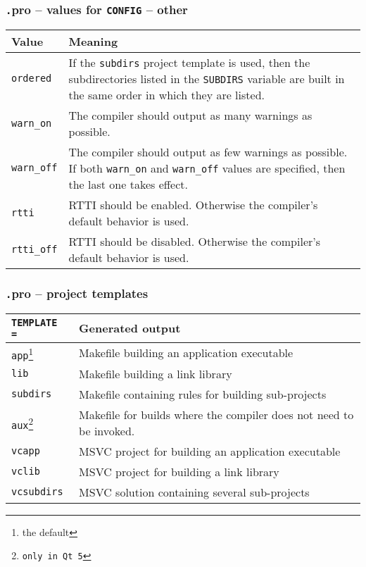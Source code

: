 \begin{frame}
\frametitle{{\texttt .pro} -- values for \texttt{CONFIG} -- other}
  \begin{center}
  \begin{tabular}{|p{}|p{}|}
    \hline
    \textbf{Value} & \textbf{Meaning} \\
    \hline
    \texttt{ordered} & If the \texttt{subdirs} project template is used,
    then the subdirectories listed in the \texttt{SUBDIRS} variable are
    built in the same order in which they are listed. \\
    \hline
    \texttt{warn\_on} & The compiler should output as many warnings as possible. \\
    \hline
    \texttt{warn\_off} & The compiler should output as few warnings as possible.
    If both \texttt{warn\_on} and \texttt{warn\_off} values are specified, then
    the last one takes effect.\\
    \hline
    \texttt{rtti} & RTTI should be enabled. Otherwise the compiler's default
    behavior is used.\\
    \hline
    \texttt{rtti\_off} & RTTI should be disabled. Otherwise the compiler's default
    behavior is used.\\
    \hline
  \end{tabular}
  \end{center}
\end{frame}

\begin{frame}
  \frametitle{{\texttt .pro} -- project templates}
  \begin{center}
  \begin{tabular}{|p{}|p{}|}
    \hline
    \textbf{\texttt{TEMPLATE =}} & \textbf{Generated output} \\
    \hline
    \texttt{app}\footnote{the default} & Makefile building an application executable \\
    \hline
    \texttt{lib} & Makefile building a link library \\
    \hline
    \texttt{subdirs} & Makefile containing rules for building sub-projects \\
    \hline
    \texttt{aux\footnote{only in Qt 5}} & Makefile for builds where the compiler
      does not need to be invoked. \\
    \hline
    \texttt{vcapp} & MSVC project for building an application executable \\
    \hline
    \texttt{vclib} & MSVC project for building a link library \\
    \hline
    \texttt{vcsubdirs} & MSVC solution containing several sub-projects \\
    \hline
  \end{tabular}
  \end{center}
\end{frame}


